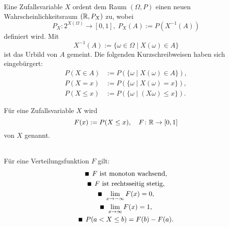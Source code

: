 \noindent
Eine Zufallsvariable $X$ ordent dem Raum $(\Omega,P)$
einen neuen Wahrscheinlichkeitsraum $(\mathbb R,P_X)$ zu, wobei
\begin{equation}
P_X\colon 2^{X(\Omega)}\to [0,1],\; P_X(A):=P(X^{-1}(A))
\end{equation}
definiert wird. Mit
\begin{equation}
X^{-1}(A) := \{\omega\in\Omega\mid X(\omega)\in A\}
\end{equation}
ist das Urbild von $A$ gemeint.
Die folgenden Kurzschreibweisen haben sich
eingebürgert:
\begin{align}
P(X\in A) &:= P(\{\omega\mid X(\omega)\in A\}),\\
P(X=x) &:= P(\{\omega\mid X(\omega)=x\}),\\
P(X\le x) &:= P(\{\omega\mid (X\omega)\le x\}).
\end{align}

\begin{definition}[Verteilungsfunktion]\mbox{}\newline
Für eine Zufallsvariable $X$ wird
\begin{equation}
F(x):=P(X\le x),\quad F\colon\mathbb R\to [0,1]
\end{equation}
 von $X$ genannt.
\end{definition}

\noindent
{}\\
Für eine Verteilungsfunktion $F$ gilt:
\begin{gather}
\text{\scriptsize $\blacksquare$}\;\, F\text{ ist monoton wachsend},\\
\text{\scriptsize $\blacksquare$}\;\, F\text{ ist rechtsseitig stetig},\\
\text{\scriptsize $\blacksquare$}\;\, \lim\limits_{x\to -\infty} F(x) = 0,\\
\text{\scriptsize $\blacksquare$}\;\, \lim\limits_{x\to\infty} F(x)=1,\\
\text{\scriptsize $\blacksquare$}\;\, P(a<X\le b) = F(b)-F(a).
\end{gather}

